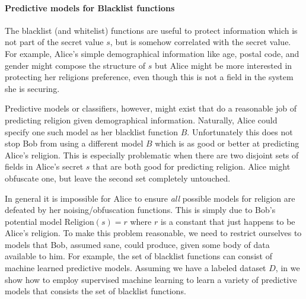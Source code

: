 \documentclass{article} %
\newcommand{\pxm}[1]{\textcolor{red}{PM -- #1}}
\theoremstyle{plain} %
\theoremstyle{definition} %
\begin{document}
\paragraph*{Predictive models for Blacklist functions} The blacklist
(and whitelist) functions are useful to protect information which is
not part of the secret value $ s $, but is somehow correlated with the
secret value. For example, Alice's simple demographical information
like age, postal code, and gender might compose the structure of $ s $
but Alice might be more interested in protecting her religions
preference, even though this is not a field in the system she is
securing.

Predictive models or classifiers, however, might exist that do a
reasonable job of predicting religion given demographical
information. Naturally, Alice could specify one such model as her
blacklist function $ B $. Unfortunately this does not stop Bob from
using a different model $ B $ which is as good or better at predicting
Alice's religion. This is especially problematic when there are two
disjoint sets of fields in Alice's secret $ s $ that are both good for
predicting religion. Alice might obfuscate one, but leave the second
set completely untouched.

In general it is impossible for Alice to ensure \emph{all} possible
models for religion are defeated by her noising/obfuscation
functions. This is simply due to Bob's potential model $
\text{Religion}(s) = r $ where $ r $ is a constant that just happens
to be Alice's religion. To make this problem reasonable, we need to
restrict ourselves to models that Bob, assumed sane, could produce,
given some body of data available to him. For example, the set of blacklist functions can
consist of machine learned predictive models.  Assuming we have a labeled dataset $ D $,
in \cite{chakraborty12balancing} we show how to employ supervised machine learning to
learn a variety of predictive models that consists the set of blacklist functions.

  
\end{document}
